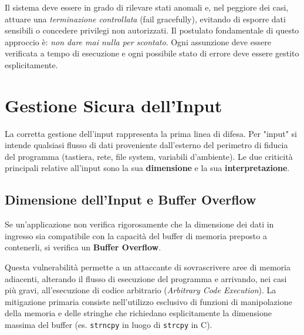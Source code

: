 Il sistema deve essere in grado di rilevare stati anomali e, nel peggiore dei casi, attuare una \textit{terminazione controllata} (fail gracefully), evitando di esporre dati sensibili o concedere privilegi non autorizzati. Il postulato fondamentale di questo approccio è: \textit{non dare mai nulla per scontato}. Ogni assunzione deve essere verificata a tempo di esecuzione e ogni possibile stato di errore deve essere gestito esplicitamente.

\section{Gestione Sicura dell'Input}
La corretta gestione dell'input rappresenta la prima linea di difesa. Per "input" si intende qualsiasi flusso di dati proveniente dall'esterno del perimetro di fiducia del programma (tastiera, rete, file system, variabili d'ambiente). Le due criticità principali relative all'input sono la sua \textbf{dimensione} e la sua \textbf{interpretazione}.

\subsection{Dimensione dell'Input e Buffer Overflow}
Se un'applicazione non verifica rigorosamente che la dimensione dei dati in ingresso sia compatibile con la capacità del buffer di memoria preposto a contenerli, si verifica un \textbf{Buffer Overflow}.



Questa vulnerabilità permette a un attaccante di sovrascrivere aree di memoria adiacenti, alterando il flusso di esecuzione del programma e arrivando, nei casi più gravi, all'esecuzione di codice arbitrario (\textit{Arbitrary Code Execution}). La mitigazione primaria consiste nell'utilizzo esclusivo di funzioni di manipolazione della memoria e delle stringhe che richiedano esplicitamente la dimensione massima del buffer (es. \texttt{strncpy} in luogo di \texttt{strcpy} in C).

